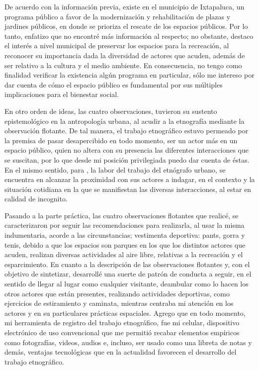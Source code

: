 \documentclass[
  spanish,
  11pt,
  a4paper,
]{scrbook}
\begin{document}
De acuerdo con la información previa, existe en el municipio de
Ixtapaluca, un programa público a favor de la modernización y
rehabilitación de plazas y jardines públicos, en donde se prioriza el
rescate de los espacios públicos. Por lo tanto, enfatizo que no encontré
más información al respecto; no obstante, destaco el interés a nivel
municipal de preservar los espacios para la recreación, al reconocer su
importancia dada la diversidad de actores que acuden, además de ser
relativo a la cultura y el medio ambiente. En consecuencia, no tengo
como finalidad verificar la existencia algún programa en particular,
sólo me intereso por dar cuenta de cómo el espacio público es
fundamental por sus múltiples implicaciones para el bienestar social.

En otro orden de ideas, las cuatro observaciones, tuvieron su sustento
epistemológico en la antropología urbana, al acudir a la etnografía
mediante la observación flotante. De tal manera, el trabajo etnográfico
estuvo permeado por la premisa de pasar desapercibido en todo momento,
ser un actor más en un espacio público, quien no altera con su presencia
las diferentes interacciones que se suscitan, por lo que desde mi
posición privilegiada puedo dar cuenta de éstas. En el mismo sentido,
para \textcite{Delgado1999}, la labor del trabajo del etnógrafo urbano,
se encuentra en alcanzar la proximidad con sus actores a indagar, en el
contexto y la situación cotidiana en la que se manifiestan las diversas
interacciones, al estar en calidad de incognito.

Pasando a la parte práctica, las cuatro observaciones flotantes que
realicé, se caracterizaron por seguir las recomendaciones para
realizarla, al usar la misma indumentaria, acorde a las circunstancias;
vestimenta deportiva: pants, gorra y tenis, debido a que los espacios
son parques en los que los distintos actores que acuden, realizan
diversas actividades al aire libre, relativas a la recreación y el
esparcimiento. En cuanto a la descripción de las observaciones flotantes
y, con el objetivo de sintetizar, desarrollé una suerte de patrón de
conducta a seguir, en el sentido de llegar al lugar como cualquier
visitante, deambular como lo hacen los otros actores que están
presentes, realizando actividades deportivas, como ejercicios de
estiramiento y caminata, mientras centraba mi atención en los actores y
en su particulares prácticas espaciales. Agrego que en todo momento, mi
herramienta de registro del trabajo etnográfico, fue mi celular,
dispositivo electrónico de uso convencional que me permitió recabar
elementos empíricos como fotografías, videos, audios e, incluso, ser
usado como una libreta de notas y demás, ventajas tecnológicas que en la
actualidad favorecen el desarrollo del trabajo etnográfico.
\end{document}
